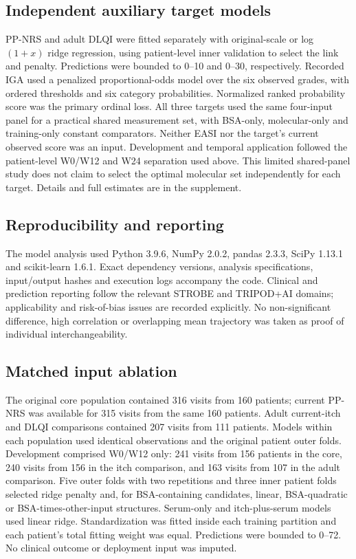 \subsection{Independent auxiliary target models}
PP-NRS and adult DLQI were fitted separately with original-scale or log$(1+x)$ ridge regression, using patient-level inner validation to select the link and penalty. Predictions were bounded to 0--10 and 0--30, respectively. Recorded IGA used a penalized proportional-odds model over the six observed grades, with ordered thresholds and six category probabilities. Normalized ranked probability score was the primary ordinal loss. All three targets used the same four-input panel for a practical shared measurement set, with BSA-only, molecular-only and training-only constant comparators. Neither EASI nor the target's current observed score was an input. Development and temporal application followed the patient-level W0/W12 and W24 separation used above. This limited shared-panel study does not claim to select the optimal molecular set independently for each target. Details and full estimates are in the supplement.

\subsection{Reproducibility and reporting}
The model analysis used Python 3.9.6, NumPy 2.0.2, pandas 2.3.3, SciPy 1.13.1 and scikit-learn 1.6.1. Exact dependency versions, analysis specifications, input/output hashes and execution logs accompany the code. Clinical and prediction reporting follow the relevant STROBE and TRIPOD+AI domains; applicability and risk-of-bias issues are recorded explicitly.\citep{vonelm2007strobe,collins2024tripod,moons2025probast} No non-significant difference, high correlation or overlapping mean trajectory was taken as proof of individual interchangeability.

\subsection*{Matched input ablation}
The original core population contained 316 visits from 160 patients; current PP-NRS was available for 315 visits from the same 160 patients. Adult current-itch and DLQI comparisons contained 207 visits from 111 patients. Models within each population used identical observations and the original patient outer folds. Development comprised W0/W12 only: 241 visits from 156 patients in the core, 240 visits from 156 in the itch comparison, and 163 visits from 107 in the adult comparison. Five outer folds with two repetitions and three inner patient folds selected ridge penalty and, for BSA-containing candidates, linear, BSA-quadratic or BSA-times-other-input structures. Serum-only and itch-plus-serum models used linear ridge. Standardization was fitted inside each training partition and each patient's total fitting weight was equal. Predictions were bounded to 0--72. No clinical outcome or deployment input was imputed.

